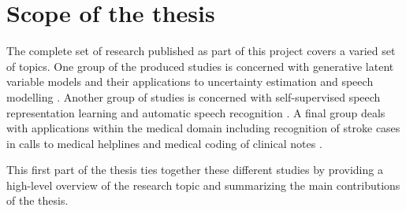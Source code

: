 


\section{Scope of the thesis}

The complete set of research published as part of this project covers a varied set of topics. One group of the produced studies is concerned with generative latent variable models and their applications to uncertainty estimation and speech modelling \cite{havtorn_hierarchical_2021,havtorn_benchmarking_2022,bergamin_modelagnostic_2022}. Another group of studies is concerned with self-supervised speech representation learning and automatic speech recognition \cite{borgholt_scaling_2021,borgholt_we_2021,mohamed_selfsupervised_2022,borgholt_brief_2022}. A final group deals with applications within the medical domain including recognition of stroke cases in calls to medical helplines \cite{wenstrup_retrospective_2023} and medical coding of clinical notes \cite{edin_automated_2023}. 

This first part of the thesis ties together these different studies by providing a high-level overview of the research topic and summarizing the main contributions of the thesis.












